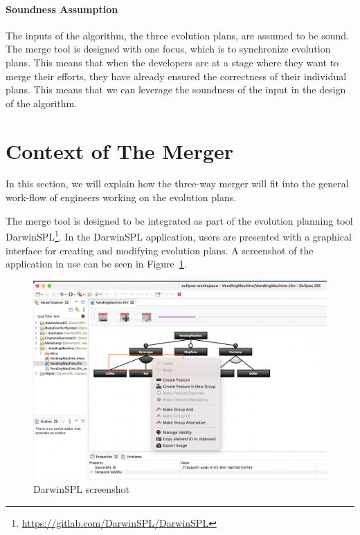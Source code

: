 \documentclass[a4paper,english]{ifimaster}
\begin{document}
\paragraph{Soundness Assumption}%
\label{par:soundness_assumption}

The inputs of the algorithm, the three evolution plans, are assumed to be sound. The merge tool is designed with one focus, which is to synchronize evolution plans. This means that when the developers are at a stage where they want to merge their efforts, they have already ensured the correctness of their individual plans. This means that we can leverage the soundness of the input in the design of the algorithm. 

\section{Context of The Merger}%
\label{sec:context_of_the_merger}

In this section, we will explain how the three-way merger will fit into the general work-flow of engineers working on the evolution plans.

The merge tool is designed to be integrated as part of the evolution planning tool DarwinSPL\footnote{\url{https://gitlab.com/DarwinSPL/DarwinSPL}}. In the DarwinSPL application, users are presented with a graphical interface for creating and modifying evolution plans. A screenshot of the application in use can be seen in Figure~\ref{fig:darwin_spl_screenshot}.

\begin{figure}[htpb]
  \centering
  \includegraphics[width=\linewidth]{darwin_spl_screenshot.png}
  \caption{DarwinSPL screenshot}%
  \label{fig:darwin_spl_screenshot}
\end{figure}
\end{document}
